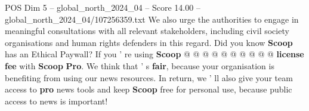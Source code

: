\begin{textsample}{POS Dim 5 – global\_north\_2024\_04 – Score 14.00 – global\_north\_2024\_04/107256359.txt}
We also urge the authorities to engage in meaningful consultations with all relevant stakeholders, including civil society organisations and human rights defenders in this regard.
Did you know \textbf{Scoop} has an Ethical Paywall?
If you ' re using \textbf{Scoop} @ @ @ @ @ @ @ @ @ @ \textbf{license} \textbf{fee} with \textbf{Scoop} \textbf{Pro}.
We think that ' s \textbf{fair}, because your organisation is benefiting from using our news resources.
In return, we ' ll also give your team access to \textbf{pro} news tools and keep \textbf{Scoop} free for personal use, because public access to news is important!

\end{textsample}
